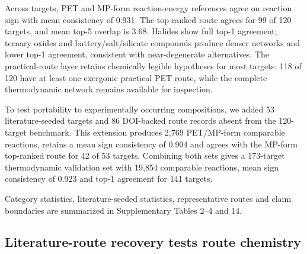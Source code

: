 \documentclass[11pt, letterpaper]{article}
\begin{document}
Across targets, PET and MP-form reaction-energy references agree on reaction sign with mean consistency of 0.931. The top-ranked route agrees for 99 of 120 targets, and mean top-5 overlap is 3.68. Halides show full top-1 agreement; ternary oxides and battery/salt/silicate compounds produce denser networks and lower top-1 agreement, consistent with near-degenerate alternatives. The practical-route layer retains chemically legible hypotheses for most targets: 118 of 120 have at least one exergonic practical PET route, while the complete thermodynamic network remains available for inspection.

To test portability to experimentally occurring compositions, we added 53 literature-seeded targets and 86 DOI-backed route records absent from the 120-target benchmark. This extension produces 2,769 PET/MP-form comparable reactions, retains a mean sign consistency of 0.904 and agrees with the MP-form top-ranked route for 42 of 53 targets. Combining both sets gives a 173-target thermodynamic validation set with 19,854 comparable reactions, mean sign consistency of 0.923 and top-1 agreement for 141 targets.



\noindent Category statistics, literature-seeded statistics, representative routes and claim boundaries are summarized in Supplementary Tables 2--4 and 14.

\subsection*{Literature-route recovery tests route chemistry}
\end{document}
